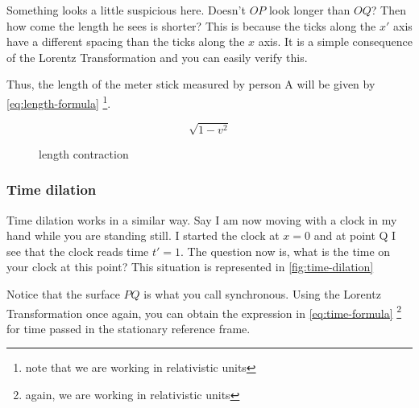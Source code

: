\documentclass[16pt]{scrartcl}
\numberwithin{equation}{section}
\theoremstyle{plain}
\theoremstyle{definition}
\begin{document}
Something looks a little suspicious here. Doesn't $OP$ look longer than $OQ$? Then how come the length he sees is shorter? This is because the ticks along the $x'$ axis have a different spacing than the ticks along the $x$ axis. It is a simple consequence of the Lorentz Transformation and you can easily verify this. 

Thus, the length of the meter stick measured by person A will be given by \autoref{eq:length-formula} \footnote{note that we are working in relativistic units}.

\begin{equation}
    \sqrt{1-v^2}
    \label{eq:length-formula}
\end{equation}


\hspace{\fill}
\begin{figure}
    \centering
    \caption{length contraction}
    \label{fig:length-contraction}
\end{figure}

\subsubsection*{Time dilation}

Time dilation works in a similar way. Say I am now moving with a clock in my hand while you are standing still. I started the clock at $x=0$ and at point Q I see that the clock reads time $t'=1$. The question now is, what is the time on your clock at this point? This situation is represented in \autoref{fig:time-dilation}

Notice that the surface $PQ$ is what you call synchronous. Using the Lorentz Transformation once again, you can obtain the expression in \autoref{eq:time-formula} \footnote{again, we are working in relativistic units} for time passed in the stationary reference frame.
\end{document}
